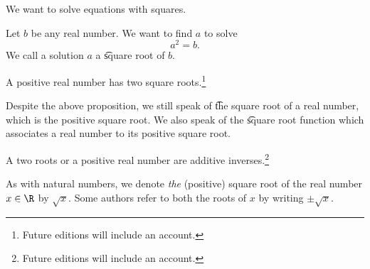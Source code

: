 

We want to solve equations with squares.


Let $b$ be any real number.
We want to find $a$ to solve
$$
  a^2 = b.
$$
We call a solution $a$ a \t{square root} of $b$.

\begin{prop}
  A positive real number has two square roots.\footnote{Future editions will include an account.}
\end{prop}

Despite the above proposition, we still speak of \t{the square root} of a real number, which is the positive square root.
We also speak of the \t{square root function} which associates a real number to its positive square root.

\begin{prop}
  A two roots or a positive real number are additive inverses.\footnote{Future editions will include an account.}
\end{prop}


As with natural numbers, we denote \textit{the} (positive) square root of the real number $x \in \R$ by $\sqrt{x}$.
Some authors refer to both the roots of $x$ by writing $\pm\sqrt{x}$.

\blankpage
